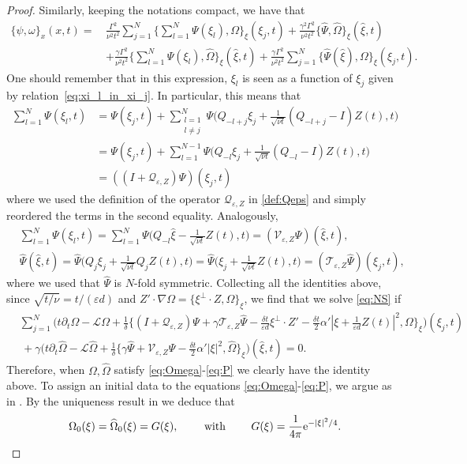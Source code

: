 \documentclass[11pt,reqno,a4paper]{amsart}
\def\eps{\varepsilon}
\def\e{{\rm e}}
\def\de{{\partial}}
\newcommand{\cL}{\mathcal{L}}
\newcommand{\cQ}{\mathcal{Q}}
\newcommand{\cT}{\mathcal{T}}
\newcommand{\cV}{\mathcal{V}}
\newcommand{\1}{\mathbbm{1}}
\theoremstyle{definition}
\theoremstyle{definition}
\numberwithin{equation}{section}
\begin{document}
\begin{proof}
Similarly, keeping the notations compact, we have that 
\begin{align}
    \{\psi,\omega\}_x(x,t)=\,&\frac{\Gamma^2}{\nu^2 t^2}\sum_{j=1}^{N}\bigg\{\sum_{l=1}^N\Psi(\xi_l),\Omega\bigg\}_\xi(\xi_j,t)+
    \frac{\gamma^2\Gamma^2}{\nu^2 t^2}\{\widehat{\Psi},\widehat{\Omega}\}_\xi(\widehat{\xi},t)\\
    &+\frac{\gamma\Gamma^2}{\nu^2 t^2}\bigg\{\sum_{l=1}^N\Psi(\xi_l),\widehat{\Omega}\bigg\}_\xi(\widehat{\xi},t)+\frac{\gamma\Gamma^2}{\nu^2 t^2}\sum_{j=1}^N\{\widehat{\Psi}(\widehat{\xi}),\Omega\}_\xi(\xi_j,t).
\end{align}
One should remember that in this expression, $\xi_l$ is seen as a function of $\xi_j$ given by relation~\cref{eq:xi_l_in_xi_j}. In particular, this means that
\begin{align}
\sum_{l=1}^N\Psi(\xi_l,t) & =\Psi(\xi_j,t)+\sum_{\substack{l=1\\ l\neq j}}^N\Psi\Big(Q_{-l+j}\xi_j+\frac{1}{\sqrt{\nu t}}(Q_{-l+j}-I)Z(t),t\Big) \\
& = \Psi(\xi_j,t)+\sum_{l=1}^{N-1}\Psi\Big(Q_{-l}\xi_j+\frac{1}{\sqrt{\nu t}}(Q_{-l}-I)Z(t),t\Big)\\
& =((I+\cQ_{\eps,Z})\Psi)(\xi_j,t)
\end{align}
where we used the definition of the operator $\cQ_{\eps,Z}$ in \cref{def:Qeps} and simply reordered the terms in the second equality. Analogously,
\begin{align}
    &\sum_{l=1}^N\Psi(\xi_l,t) =   \sum_{l=1}^N\Psi\bigg(Q_{-l}\widehat{\xi}-\frac{1}{\sqrt{\nu t}}Z(t),t\bigg)=(\cV_{\eps,Z}\Psi)(\widehat{\xi},t),\\
    &\widehat{\Psi}(\widehat{\xi},t)=   \widehat{\Psi}\bigg(Q_j\xi_j+\frac{1}{\sqrt{\nu t}}Q_jZ(t),t\bigg)= \widehat{\Psi}\bigg(\xi_j+\frac{1}{\sqrt{\nu t}}Z(t),t\bigg)=(\cT_{\eps,Z}\widehat{\Psi})(\xi_j,t),
\end{align}
where we used that $\widehat{\Psi}$ is $N$-fold symmetric. Collecting all the identities above, since $\sqrt{t/\nu}=t/(\eps d)$ and $Z'\cdot \nabla \Omega = \{\xi^\perp \cdot Z , \Omega\}_\xi$, we find that we solve \cref{eq:NS} if
\begin{align}
   &\sum_{j=1}^N\bigg(t\de_t\Omega-\cL\Omega+\frac{1}{\delta}\Big\{(I+\cQ_{\eps,Z})\Psi+\gamma \cT_{\eps,Z}\widehat{\Psi}-\frac{\delta t}{ \eps d}\xi^\perp\cdot Z'- \frac{\delta t}{2}\alpha'|\xi+\frac{1}{\eps d}Z(t)|^2, \Omega\Big\}_\xi\bigg)(\xi_j,t)\\
   &\, +\gamma\bigg(t\de_t\widehat{\Omega}-\cL \widehat{\Omega}+\frac{1}{\delta}\Big\{\gamma \widehat{\Psi}+\cV_{\eps,Z} \Psi-\frac{\delta t}{2} \alpha'|\xi|^2, \widehat{\Omega}\Big\}_\xi\bigg)(\widehat{\xi},t)=0.
\end{align}
Therefore, when $\Omega,\widehat{\Omega}$ satisfy \cref{eq:Omega}-\cref{eq:P} we clearly have the identity above.
To assign an initial data to the equations \cref{eq:Omega}-\cref{eq:P}, we argue as in \cite{dolce2024long}. By the uniqueness result in \cite{GaGa2005} we deduce that 
\begin{equation}
\label{def:G}
\Omega_0(\xi)=\widehat{\Omega}_0(\xi)=G(\xi), \qquad \text{ with } \qquad G(\xi)=\frac{1}{4\pi}\e^{-|\xi|^2/4}.
\end{equation}
\end{proof}
\end{document}

